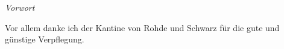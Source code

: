 

\newpage
\thispagestyle{empty}
\begin{center}
\Huge\emph{Vorwort}
\end{center}
\medskip
\noindent

Vor allem danke ich der Kantine von Rohde und Schwarz für die gute und günstige Verpflegung.
